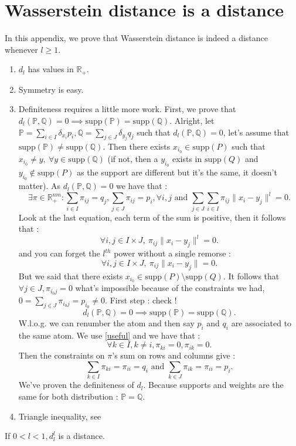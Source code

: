 \documentclass{amsart}
\newcommand{\RR}{\mathbb{R}}
\begin{document}
\section{Wasserstein distance is a distance}\label{distance}
In this appendix, we prove that Wasserstein distance is indeed a distance whenever $l\geq1$.
\begin{enumerate}
    \item $d_l$ has values in $\RR_+$.
    \item Symmetry is easy.
    \item Definiteness requires a little more work. First, we prove that $d_l\left(\mathbb{P},\mathbb{Q}\right)=0\implies \text{supp}\left(\mathbb{P}\right)=\text{supp}\left(\mathbb{Q}\right)$. Alright, let $\mathbb{P}=\sum_{i\in I}\delta_{x_i}p_i,\mathbb{Q}=\sum_{j\in J}\delta_{y_j}q_j$ such that $d_l\left(\mathbb{P},\mathbb{Q}\right)=0$, let's assume that $\text{supp}\left(\mathbb{P}\right)\ne\text{supp}\left(\mathbb{Q}\right)$. Then there exists $x_{i_0}\in \text{supp}\left(P\right)$ such that $x_{i_0}\neq y, \:\forall y\in\text{supp}\left(\mathbb{Q}\right)$ (if not, then a $y_{i_0}$ exists in $\text{supp}\left(Q\right)$ and $y_{i_0}\notin \text{supp}\left(P\right)$ as the support are different but it's the same, it doesn't matter). As $d_l\left(\mathbb{P},\mathbb{Q}\right)=0$ we have that :$$
    \exists\pi\in\RR^{nm}_+ : \sum_{i\in I}\pi_{ij}=q_j, \sum_{j\in J}\pi_{ij}=p_i, \forall i,j \text{ and } \sum_{j\in J}\sum_{i\in I}\pi_{ij}\lVert x_i-y_j\rVert^l=0.
    $$
    Look at the last equation, each term of the sum is positive, then it follows that :
    \begin{equation}\label{useful}
    \forall i,j \in I\times J, \: \pi_{ij}\lVert x_i-y_j\rVert^l=0.
    \end{equation}
    and you can forget the $l^{th}$ power without a single remorse :
    $$
     \forall i,j \in I\times J, \: \pi_{ij}\lVert x_i-y_j\rVert=0.
    $$
    But we said that there exists $x_{i_0}\in\text{supp}\left(P\right)\setminus\text{supp}\left(Q\right)$. It follows that $\forall j\in J, \pi_{i_0j}=0$ what's impossible because of the constraints we had, $0=\sum_{j\in J}\pi_{i_0j}=p_{i_0}\neq0.$ First step : check ! $$d_l\left(\mathbb{P},\mathbb{Q}\right)=0\implies \text{supp}\left(\mathbb{P}\right)=\text{supp}\left(\mathbb{Q}\right).$$
    W.l.o.g. we can renumber the atom and then say $p_i$ and $q_i$ are associated to the same atom. We use \ref{useful} and we have that :
    $$
    \forall k\in I, k\neq i, \pi_{ki}=0, \pi_{ik}=0.
    $$
    Then the constraints on $\pi$'s sum on rows and columns give  : $$ 
    \sum_{k\in I}\pi_{ki}=\pi_{ii}=q_i \text{ and } \sum_{k\in J}\pi_{ik}=\pi_{ii}=p_i.
    $$
    We've proven the definiteness of $d_l$. Because supports and weights are the same for both distribution : $\mathbb{P}=\mathbb{Q}$.
    \item Triangle inequality, see \cite[Proposition 2.2]{peyre_computational_2019}
\end{enumerate}
\begin{remark}
    If $0<l<1, d_l^l$ is a distance.
\end{remark}
\end{document}
